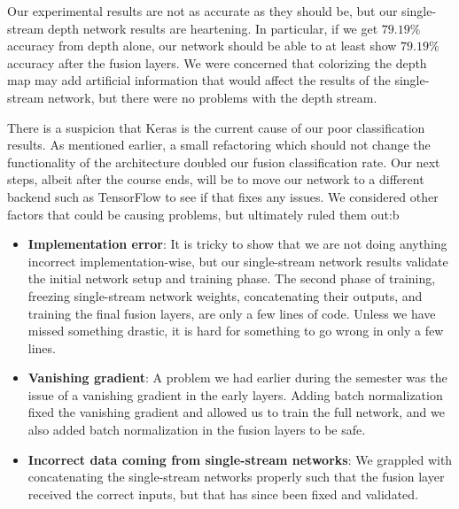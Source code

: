 
Our experimental results are not as accurate as they should be, but our single-stream depth network results are heartening. In particular, if we get $79.19\%$ accuracy from depth alone, our network should be able to at least show $79.19\%$ accuracy after the fusion layers. We were concerned that colorizing the depth map may add artificial information that would affect the results of the single-stream network, but there were no problems with the depth stream.

There is a suspicion that Keras is the current cause of our poor classification results. As mentioned earlier, a small refactoring which should not change the functionality of the architecture doubled our fusion classification rate. Our next steps, albeit after the course ends, will be to move our network to a different backend such as TensorFlow to see if that fixes any issues. We considered other factors that could be causing problems, but ultimately ruled them out:b

\begin{itemize}
    \item \textbf{Implementation error}: It is tricky to show that we are not doing anything incorrect implementation-wise, but our single-stream network results validate the initial network setup and training phase. The second phase of training, freezing single-stream network weights, concatenating their outputs, and training the final fusion layers, are only a few lines of code. Unless we have missed something drastic, it is hard for something to go wrong in only a few lines.

    \item \textbf{Vanishing gradient}: A problem we had earlier during the semester was the issue of a vanishing gradient in the early layers. Adding batch normalization fixed the vanishing gradient and allowed us to train the full network, and we also added batch normalization in the fusion layers to be safe. 

    \item \textbf{Incorrect data coming from single-stream networks}: We grappled with concatenating the single-stream networks properly such that the fusion layer received the correct inputs, but that has since been fixed and validated.

\end{itemize}



